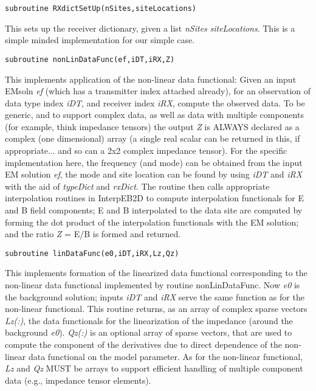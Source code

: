 \documentclass[12pt]{article}
\begin{document}
\begin{verbatim}
subroutine RXdictSetUp(nSites,siteLocations)
\end{verbatim}

This sets up the receiver dictionary, given a list 
{\it nSites} {\it siteLocations}.
This is a simple minded implementation for our
simple case.

\begin{verbatim}
subroutine nonLinDataFunc(ef,iDT,iRX,Z)
\end{verbatim}

This implements application of the non-linear data functional:
Given an input EMsoln {\it ef}
(which has a transmitter index attached
already), for an observation of data type index {\it iDT}, and
receiver index {\it iRX}, compute the observed data.  To be
generic, and to support complex data, as well as data with
multiple components (for example, think impedance tensors)
the output {\it Z} is ALWAYS declared as a complex (one dimensional)
array (a single real scalar can be returned in this, if appropriate...
and so can a 2x2 complex impedance tensor).  For the specific
implementation here, the frequency (and mode) can be obtained
from the input EM solution {\it ef}, the mode and
site location can be found by using {\it iDT} and {\it iRX} with the
aid of {\it typeDict} and {\it rxDict}.
The routine then calls appropriate interpolation
routines in InterpEB2D to compute interpolation functionals
for E and B field components; E and B interpolated to the data
site are computed by forming the dot product of the interpolation
functionals with the EM solution; and the ratio {\it Z} = E/B is formed
and returned.

\begin{verbatim}
subroutine linDataFunc(e0,iDT,iRX,Lz,Qz)
\end{verbatim}

This implements formation of the linearized data functional
corresponding to the non-linear data functional implemented
by routine nonLinDataFunc.  Now {\it e0} is the background solution;
inputs {\it iDT} and {\it iRX} serve the same function as for the non-linear
functional.  This routine returns, as an array of complex
sparse vectors {\it Lz(:)}, the data functionals for the linearization
of the impedance (around the background {\it e0}).  {\it Qz(:)}
is an optional array of sparse vectors, 
that are used to compute the component
of the derivatives due to direct dependence of the non-linear 
data functional on the model parameter.  As for the non-linear
functional, {\it Lz} and {\it Qz} MUST be 
arrays to support efficient handling
of multiple component data (e.g., impedance tensor elements).
\end{document}
